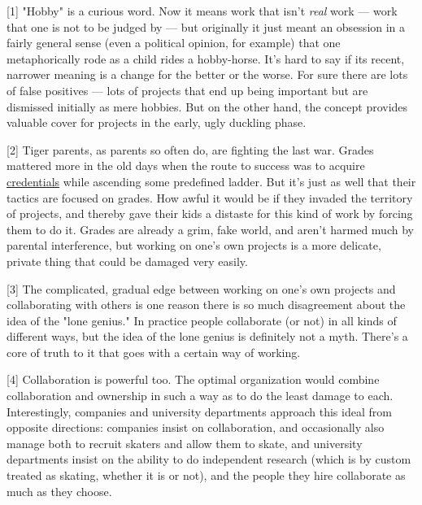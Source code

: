 [1] "Hobby" is a curious word. Now it means work that isn't
                  \emph{real} work --- work that one is not to be judged by
                  --- but originally it just meant an obsession in a fairly
                  general sense (even a political opinion, for example) that one
                  metaphorically rode as a child rides a hobby-horse. It's hard
                  to say if its recent, narrower meaning is a change for the
                  better or the worse. For sure there are lots of false
                  positives --- lots of projects that end up being important
                  but are dismissed initially as mere hobbies. But on the other
                  hand, the concept provides valuable cover for projects in the
                  early, ugly duckling phase.

[2] Tiger parents, as parents so often do, are fighting the
                  last war. Grades mattered more in the old days when the route
                  to success was to acquire
                  \href{http://www.paulgraham.com/credentials.html}{\underline{credentials}}
                  while ascending some predefined ladder. But it's just as well
                  that their tactics are focused on grades. How awful it would
                  be if they invaded the territory of projects, and thereby gave
                  their kids a distaste for this kind of work by forcing them to
                  do it. Grades are already a grim, fake world, and aren't
                  harmed much by parental interference, but working on one's own
                  projects is a more delicate, private thing that could be
                  damaged very easily.

[3] The complicated, gradual edge between working on one's own
                  projects and collaborating with others is one reason there is
                  so much disagreement about the idea of the "lone genius." In
                  practice people collaborate (or not) in all kinds of different
                  ways, but the idea of the lone genius is definitely not a
                  myth. There's a core of truth to it that goes with a certain
                  way of working.

[4] Collaboration is powerful too. The optimal organization
                  would combine collaboration and ownership in such a way as to
                  do the least damage to each. Interestingly, companies and
                  university departments approach this ideal from opposite
                  directions: companies insist on collaboration, and
                  occasionally also manage both to recruit skaters and allow
                  them to skate, and university departments insist on the
                  ability to do independent research (which is by custom treated
                  as skating, whether it is or not), and the people they hire
                  collaborate as much as they choose.

